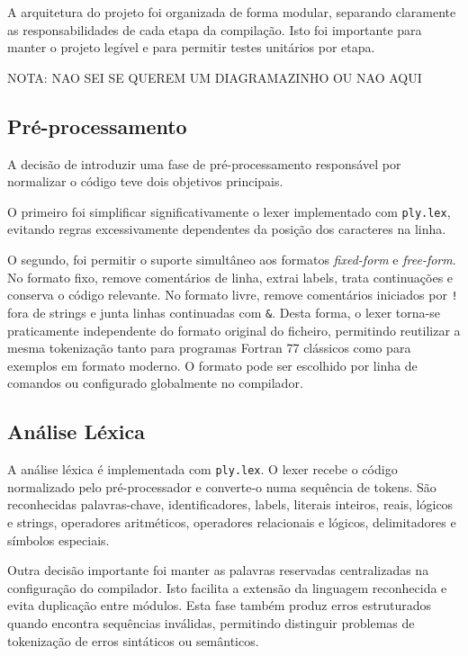 \documentclass[11pt,a4paper]{report}
\begin{document}
A arquitetura do projeto foi organizada de forma modular, separando claramente as responsabilidades de cada etapa da compilação. Isto foi importante para manter o projeto legível e para permitir testes unitários por etapa.

NOTA: NAO SEI SE QUEREM UM DIAGRAMAZINHO OU NAO AQUI

\subsection{Pré-processamento}

A decisão de introduzir uma fase de pré-processamento responsável por normalizar o código teve dois objetivos principais.

O primeiro foi simplificar significativamente o lexer implementado com \texttt{ply.lex}, evitando regras excessivamente dependentes da posição dos caracteres na linha.

O segundo, foi permitir o suporte simultâneo aos formatos \textit{fixed-form} e \textit{free-form}. No formato fixo, remove comentários de linha, extrai labels, trata continuações e conserva o código relevante. No formato livre, remove comentários iniciados por \texttt{!} fora de strings e junta linhas continuadas com \texttt{\&}. Desta forma, o lexer torna-se praticamente independente do formato original do ficheiro, permitindo reutilizar a mesma tokenização tanto para programas Fortran 77 clássicos como para exemplos em formato moderno. O formato pode ser escolhido por linha de comandos ou configurado globalmente no compilador.

\subsection{Análise Léxica}

A análise léxica é implementada com \texttt{ply.lex}. O lexer recebe o código normalizado pelo pré-processador e converte-o numa sequência de tokens. São reconhecidas palavras-chave, identificadores, labels, literais inteiros, reais, lógicos e strings, operadores aritméticos, operadores relacionais e lógicos, delimitadores e símbolos especiais.

Outra decisão importante foi manter as palavras reservadas centralizadas na configuração do compilador. Isto facilita a extensão da linguagem reconhecida e evita duplicação entre módulos. Esta fase também produz erros estruturados quando encontra sequências inválidas, permitindo distinguir problemas de tokenização de erros sintáticos ou semânticos.
\end{document}
